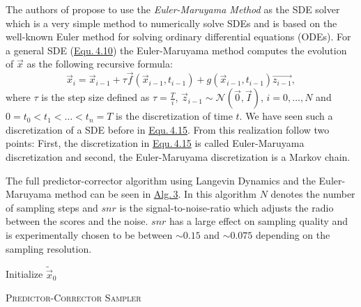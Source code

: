 The authors of \cite{score_3} propose to use the \textit{Euler-Maruyama Method} as the SDE solver which is a very simple method to numerically solve SDEs and is based on the well-known Euler method for solving ordinary differential equations (ODEs). For a general SDE (\hyperref[equ:4.10]{Equ.\,4.10}) the Euler-Maruyama method computes the evolution of $\vec{x}$ as the following recursive formula:
%
\begin{equation} \label{equ:4.20}
    \vec{x}_i=\vec{x}_{i-1}+\tau\vec{f}(\vec{x}_{i-1}, t_{i-1})+g(\vec{x}_{i-1}, t_{i-1})\vec{z_{i-1}},
\end{equation}
%
where $\tau$ is the step size defined as $\tau=\frac{T}{i}$, $\vec{z}_{i-1}\sim\mathcal{N}(\vec{0},\vec{I})$, $i=0,\dots,N$ and $0=t_0<t_1<\dots<t_n=T$ is the discretization of time $t$. We have seen such a discretization of a SDE before in \hyperref[equ:4.15]{Equ.\,4.15}. From this realization follow two points: First, the discretization in \hyperref[equ:4.15]{Equ.\,4.15} is called Euler-Maruyama discretization and second, the Euler-Maruyama discretization is a Markov chain.

The full predictor-corrector algorithm using Langevin Dynamics and the Euler-Maruyama method can be seen in \hyperref[alg:3]{Alg.\,3}. In this algorithm $N$ denotes the number of sampling steps and $snr$ is the signal-to-noise-ratio which adjusts the radio between the scores and the noise. $snr$ has a large effect on sampling quality and is experimentally chosen to be between $\sim0.15$ and $\sim0.075$ depending on the sampling resolution. 
%
\begin{algorithm} \label{alg:3}
    \DontPrintSemicolon
    Initialize $\tilde{\vec{x}}_0$\;

    
    \caption[Predictor-Corrector Sampler]{\textsc{Predictor-Corrector Sampler}}
\end{algorithm}
%
